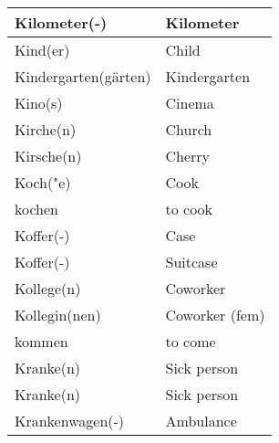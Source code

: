 \documentclass{article}
\begin{document}
\begin{minipage}{0.48\textwidth}
\begin{tabular}{|>{\raggedright\arraybackslash}p{3.5cm}|>{\raggedright\arraybackslash}p{3.5cm}|}
        Kilometer(-) & Kilometer \\\hline
        Kind(er) & Child \\\hline
        Kindergarten(gärten) & Kindergarten \\\hline
        Kino(s) & Cinema \\\hline
        Kirche(n) & Church \\\hline
        Kirsche(n) & Cherry \\\hline
        Koch("e) & Cook \\\hline
        kochen & to cook \\\hline
        Koffer(-) & Case \\\hline
        Koffer(-) & Suitcase \\\hline
        Kollege(n) & Coworker \\\hline
        Kollegin(nen) & Coworker (fem) \\\hline
        kommen & to come \\\hline
        Kranke(n) & Sick person \\\hline
        Kranke(n) & Sick person \\\hline
        Krankenwagen(-) & Ambulance \\\hline
    \end{tabular}
\end{minipage}

\newpage
\end{document}
